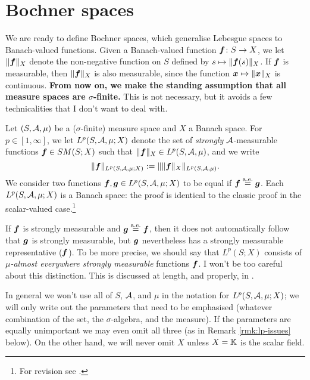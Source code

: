\section{Bochner spaces}

We are ready to define Bochner spaces, which generalise Lebesgue spaces to Banach-valued functions.
Given a Banach-valued function $\bm{f} \colon S \rightarrow X$, we let $\|\bm{f}\|_X$ denote the non-negative function on $S$ defined by $s \mapsto \|\bm{f}(s)\|_X$.
If $\bm{f}$ is measurable, then $\|\bm{f}\|_X$ is also measurable, since the function $\bm{x} \mapsto \|\bm{x}\|_X$ is continuous.
\textbf{From now on, we make the standing assumption that all measure spaces are $\sigma$-finite.} This is not necessary, but it avoids a few technicalities that I don't want to deal with.

\begin{defn}
  Let $(S,\mathcal{A},\mu)$ be a ($\sigma$-finite) measure space and $X$ a Banach space.
  For $p \in [1,\infty]$, we let $L^p(S,\mathcal{A},\mu;X)$ denote the set of \emph{strongly} $\mathcal{A}$-measurable functions $\bm{f} \in SM(S;X)$ such that $\|\bm{f}\|_X \in L^p(S,\mathcal{A},\mu)$, and we write
  \begin{equation*}
    \|\bm{f}\|_{L^p(S,\mathcal{A},\mu;X)} := \| \|\bm{f}\|_X \|_{L^p(S,\mathcal{A},\mu)}.
  \end{equation*}
  We consider two functions $\bm{f}, \bm{g} \in L^p(S,\mathcal{A},\mu;X)$ to be equal if $\bm{f} \stackrel{\mathrm{a.e.}}{=} \bm{g}$.
  Each $L^p(S,\mathcal{A},\mu;X)$ is a Banach space: the proof is identical to the classic proof in the scalar-valued case.\footnote{For revision see \cite[Theorem 5.2.1]{rD04}.}
\end{defn}

\begin{rmk}
  If $\bm{f}$ is strongly measurable and $\bm{g} \stackrel{\mathrm{a.e.}}{=} \bm{f}$, then it does not automatically follow that $\bm{g}$ is strongly measurable, but $\bm{g}$ nevertheless has a strongly measurable representative ($\bm{f}$).
  To be more precise, we should say that $L^p(S;X)$ consists of \emph{$\mu$-almost everywhere strongly measurable} functions $\bm{f}$.
  I won't be too careful about this distinction.
  This is discussed at length, and properly, in \cite[Section 1.1.b]{HNVW16}.
\end{rmk}

In general we won't use all of $S$, $\mathcal{A}$, and $\mu$ in the notation for $L^p(S,\mathcal{A},\mu;X)$; we will only write out the parameters that need to be emphasised (whatever combination of the set, the $\sigma$-algebra, and the measure).
If the parameters are equally unimportant we may even omit all three (as in Remark \ref{rmk:lp-issues} below).
On the other hand, we will never omit $X$ unless $X = \mathbb{K}$ is the scalar field.

